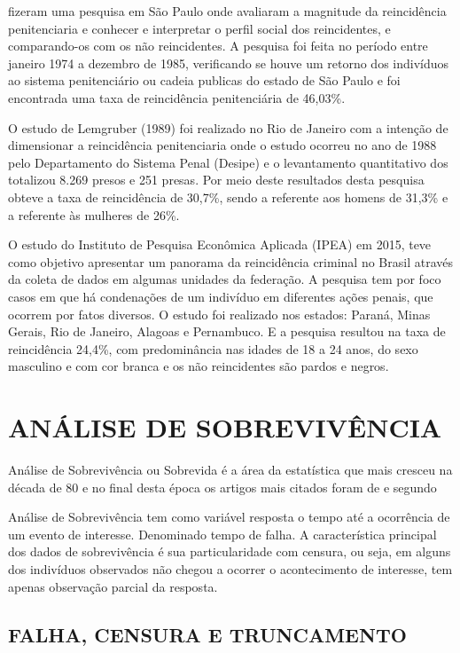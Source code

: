 fizeram uma pesquisa em São Paulo onde avaliaram a magnitude da reincidência penitenciaria e conhecer e interpretar o perfil social dos reincidentes, e comparando-os com os não reincidentes. A pesquisa foi feita no período entre janeiro 1974 a dezembro de 1985, verificando se houve um retorno dos indivíduos ao sistema penitenciário ou cadeia publicas do estado de São Paulo e foi encontrada uma taxa de reincidência penitenciária de 46,03\%.
		
O estudo de Lemgruber (1989) foi realizado no Rio de Janeiro com a intenção de dimensionar a reincidência penitenciaria onde o estudo ocorreu no ano de 1988 pelo Departamento do Sistema Penal (Desipe) e o levantamento quantitativo dos totalizou 8.269 presos e 251 presas. Por meio deste resultados desta pesquisa obteve a taxa de reincidência de 30,7\%, sendo a referente aos homens de 31,3\% e a referente às mulheres de 26\%.
		
O estudo do Instituto de Pesquisa Econômica Aplicada (IPEA) em 2015, teve como objetivo apresentar um panorama da reincidência criminal no Brasil através da coleta de dados em algumas unidades da federação. A pesquisa tem por foco casos em que há condenações de um indivíduo em diferentes ações penais, que ocorrem por fatos diversos. O estudo foi realizado nos estados: Paraná, Minas Gerais, Rio de Janeiro, Alagoas e Pernambuco. E a pesquisa resultou na taxa de reincidência 24,4\%, com predominância nas idades de 18 a 24 anos, do sexo masculino e com cor branca e os não reincidentes são pardos e negros.

	\section{ANÁLISE DE SOBREVIVÊNCIA}
		
			
Análise de Sobrevivência ou Sobrevida é a área da estatística que mais cresceu na década de 80 e no final desta época os artigos mais citados foram de  e  segundo \cite{colosimo2006analise}

Análise de Sobrevivência tem como variável resposta o tempo até a ocorrência de um evento de interesse. Denominado tempo de falha. A característica principal dos dados de sobrevivência é sua particularidade com censura, ou seja, em alguns dos indivíduos observados não chegou a ocorrer o acontecimento de interesse, tem apenas observação parcial da resposta. 

    \subsection{FALHA, CENSURA E TRUNCAMENTO}

